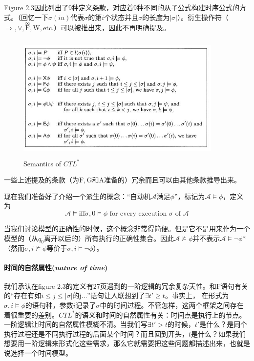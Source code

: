 \documentclass{book}
\begin{document}
    Figure 2.3因此列出了9种定义条款，对应着9种不同的从子公式构建时序公式的方式。（回忆一下$\sigma(iu)$代表$\sigma$的第$i$个状态并且$\sigma$的长度为$|\sigma|$）。衍生操作符（$\Rightarrow, \vee, \overset{\infty}{\mathrm{F}}, \mathrm{W},$etc.）可以被推出来，因此不再明确提及。
    \begin{figure}
        \centering
        \includegraphics[width=4.0in,height=2.5in]{2_3.jpg}
    \caption{Semantics of $CTL^*$}
    \end{figure}

    一些上述提及的条款（为$\mathrm{F},\mathrm{G}$和$\mathrm{A}$准备的）冗余而且可以由其他条款推导出来。

    现在我们准备好了介绍一个派生的概念：“自动机$\mathcal{A}满足\phi$”，标记为$\mathcal{A}\models\phi$，定义为
    \begin{equation}\label{D1}
      \mathcal{A}\models \text{iff} \sigma,0\models\phi \text{ for every execution } \sigma \text{ of } \mathcal{A}
    \end{equation}

    当我们讨论模型的正确性的时候，这个概念非常得简便。但是它不是用来作为一个模型的（从$q_0$离开以后的）所有执行的正确性集合。因此$\mathcal{A}\nvDash\phi$并不表示$\mathcal{A} \models \neg\phi$*（然而$\sigma,i \nvDash \phi$等价于$\sigma,i \models \neg \phi$）。

    \paragraph{时间的自然属性({\itshape nature of time})} 我们承认在figure 2.3的定义有27页遇到的一阶逻辑的冗余复杂天性。和$\mathrm{F}$语句有关的“存在有如$i \leq j \leq |\sigma|$的j$\dots$”语句让人联想到了$\exists{t'}\geq t$。事实上， 在形式为$\sigma, i \models \phi$的语句种，参数$i$记录了$\sigma$中的时间过程。不管怎样，这两个框架之间存在着很重要的差别。$CTL^*$的语义和时间的自然属性有关：时间点是执行上的节点。一阶逻辑让时间的自然属性模糊不清。当我们写$\exists{t'}>t$的时候，$t'$是什么？是同个执行过程还是不同执行过程的后面某个时间？而且回到开头，$t$是什么？如果我们想要用一阶逻辑来形式化这些需求，那么它就需要把这些问题都描述出来，也就是说选择一个时间模型。
\end{document}
